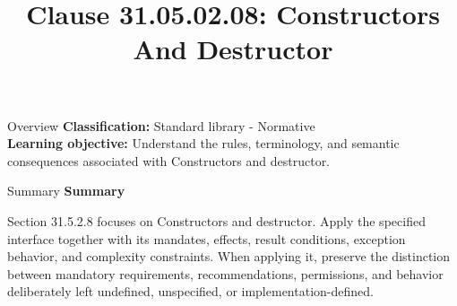 \documentclass[10pt,letterpaper]{article}
\title{Clause 31.05.02.08: Constructors And Destructor}
\author{}
\date{}
\begin{document}
\maketitle
\begin{CornellOverviewBox}{Overview}
\textbf{Classification:} Standard library - Normative\\[2pt]
\textbf{Learning objective:} Understand the rules, terminology, and semantic consequences associated with Constructors and destructor.
\end{CornellOverviewBox}\begin{CornellSummaryBox}{Summary}
{\sffamily\bfseries\color{Accent} Summary}\par\vspace{3pt}Section 31.5.2.8 focuses on Constructors and destructor. Apply the specified interface together with its mandates, effects, result conditions, exception behavior, and complexity constraints. When applying it, preserve the distinction between mandatory requirements, recommendations, permissions, and behavior deliberately left undefined, unspecified, or implementation-defined.
\end{CornellSummaryBox}
\end{document}
